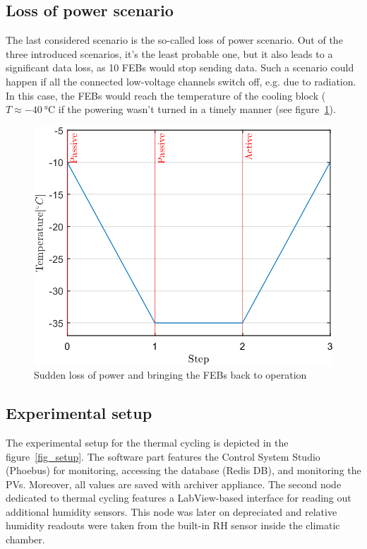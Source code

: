 \subsection{Loss of power scenario}
\label{power_loss}
The last considered scenario is the so-called loss of power scenario. Out of the three introduced scenarios, it's the least probable one, but it also leads to a significant data loss, as 10 \glspl{FEB} would stop sending data. Such a scenario could happen if all the connected low-voltage channels switch off, e.g. due to radiation. In this case, the \glspl{FEB} would reach the temperature of the cooling block ($T \approx \SI{-40}{\celsius}$ if the powering wasn't turned in a timely manner (see figure~\ref{fig_loss}).

\begin{figure}[!h]
\centering
\includegraphics[width=0.55\columnwidth]{Chapter4/images/switchoff.png}
\caption{Sudden loss of power and bringing the \glspl{FEB} back to operation}
\label{fig_loss}
\end{figure}

\subsection{Experimental setup}
\label{cycling_setup}
The experimental setup for the thermal cycling is depicted in the figure~\ref{fig_setup}. The software part features the Control System Studio (Phoebus) for monitoring, accessing the database (Redis DB), and monitoring the \gls{PV}s. Moreover, all values are saved with archiver appliance. The second node dedicated to thermal cycling features a LabView-based interface for reading out additional humidity sensors. This node was later on depreciated and relative humidity readouts were taken from the built-in \gls{RH} sensor inside the climatic chamber.

